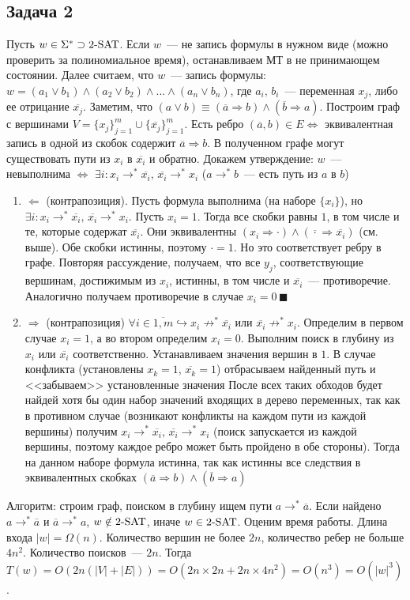 \documentclass[a4paper]{article}
\def\2SAT{{\rm{2\text{-}SAT}}}
\begin{document}
\subsection*{Задача 2}
Пусть $w\in\Sigma^*\supset\2SAT$. Если $w$~--- не запись формулы в нужном виде (можно проверить за полиномиальное время), останавливаем МТ в не принимающем состоянии. Далее считаем, что $w$~--- запись формулы: $w=(a_1\vee b_1)\wedge(a_2\vee b_2)\wedge...\wedge(a_n\vee b_n)$, где $a_i,\,b_i$~--- переменная $x_j$, либо ее отрицание $\overline{x_j}$. Заметим, что $(a\vee b)\equiv (\overline{a}\Rightarrow b)\wedge (\overline{b}\Rightarrow a)$. Построим граф с вершинами $V=\{x_j\}_{j=1}^m\cup\{\overline{x_j}\}_{j=1}^m$. Есть ребро $(\overline{a},b)\in E\Leftrightarrow $ эквивалентная запись в одной из скобок содержит $\overline{a}\Rightarrow b$. В полученном графе могут существовать пути из $x_i$ в $\overline{x_i}$ и обратно. Докажем утверждение: $w$~--- невыполнима $\Leftrightarrow$ $\exists i\colon x_i\to^*\overline{x_i},\,\overline{x_i}\to^*x_i$ ($a\to^*b$~--- есть путь из $a$ в $b$)\begin{enumerate}
\item $\boxed{\Leftarrow}$ (контрапозиция). Пусть формула выполнима (на наборе $\{x_i\}$), но $\exists i\colon x_i\to^*\overline{x_i},\,\overline{x_i}\to^*x_i$. Пусть $x_i=1$. Тогда все скобки равны $1$, в том числе и те, которые содержат $\overline{x_i}$. Они эквивалентны $(x_i\Rightarrow\cdot)\wedge(\overline{\cdot}\Rightarrow\overline{x_i})$ (см. выше). Обе скобки истинны, поэтому $\cdot=1$. Но это соответствует ребру в графе. Повторяя рассуждение, получаем, что все $y_j$, соответствующие вершинам, достижимым из $x_i$, истинны, в том числе и $\overline{x_i}$~--- противоречие. Аналогично получаем противоречие в случае $x_i=0\,\blacksquare$
\item $\boxed{\Rightarrow}$ (контрапозиция) $\forall i\in\overline{1,m}\hookrightarrow x_i\not\to^*\overline{x_i}\mbox{ или }\overline{x_i}\not\to^*x_i$. Определим в первом случае $x_i=1$, а во втором определим $x_i=0$. Выполним поиск в глубину из $x_i$ или $\overline{x_i}$ соответственно. Устанавливаем значения вершин в $1$. В случае конфликта (установлены $x_k=1$, $\overline{x_k}=1$) отбрасываем найденный путь и <<забываем>> установленные значения\newline
После всех таких обходов будет найдей хотя бы один набор значений входящих в дерево переменных, так как в противном случае (возникают конфликты на каждом пути из каждой вершины) получим $x_i\to^*\overline{x_i},\,\overline{x_i}\to^* x_i$ (поиск запускается из каждой вершины, поэтому каждое ребро может быть пройдено в обе стороны). Тогда на данном наборе формула истинна, так как истинны все следствия в эквивалентных скобках $(\overline{a}\Rightarrow b)\wedge (\overline{b}\Rightarrow a)$
\end{enumerate}
Алгоритм: строим граф, поиском в глубину ищем пути $a\to^*\overline{a}$. Если найдено $a\to^*\overline{a}$ и $\overline{a}\to^* a$, $w\notin \2SAT$, иначе $w\in\2SAT$. Оценим время работы. Длина входа $|w|=\Omega(n)$. Количество вершин не более $2n$, количество ребер не больше $4n^2$. Количество поисков~--- $2n$. Тогда $T(w)=O(2n(|V|+|E|))=O(2n\times 2n+2n\times 4n^2)=O(n^3)=O(|w|^3)$.
\end{document}
